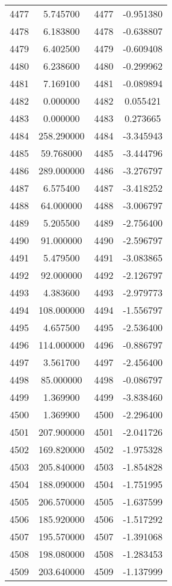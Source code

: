 \documentclass[12pt]{article}
\begin{document}
\begin{longtable}{@{}cccc@{}}
4477 & 5.745700 & 4477 & -0.951380 \\
4478 & 6.183800 & 4478 & -0.638807 \\
4479 & 6.402500 & 4479 & -0.609408 \\
4480 & 6.238600 & 4480 & -0.299962 \\
4481 & 7.169100 & 4481 & -0.089894 \\
4482 & 0.000000 & 4482 & 0.055421 \\
4483 & 0.000000 & 4483 & 0.273665 \\
4484 & 258.290000 & 4484 & -3.345943 \\
4485 & 59.768000 & 4485 & -3.444796 \\
4486 & 289.000000 & 4486 & -3.276797 \\
4487 & 6.575400 & 4487 & -3.418252 \\
4488 & 64.000000 & 4488 & -3.006797 \\
4489 & 5.205500 & 4489 & -2.756400 \\
4490 & 91.000000 & 4490 & -2.596797 \\
4491 & 5.479500 & 4491 & -3.083865 \\
4492 & 92.000000 & 4492 & -2.126797 \\
4493 & 4.383600 & 4493 & -2.979773 \\
4494 & 108.000000 & 4494 & -1.556797 \\
4495 & 4.657500 & 4495 & -2.536400 \\
4496 & 114.000000 & 4496 & -0.886797 \\
4497 & 3.561700 & 4497 & -2.456400 \\
4498 & 85.000000 & 4498 & -0.086797 \\
4499 & 1.369900 & 4499 & -3.838460 \\
4500 & 1.369900 & 4500 & -2.296400 \\
4501 & 207.900000 & 4501 & -2.041726 \\
4502 & 169.820000 & 4502 & -1.975328 \\
4503 & 205.840000 & 4503 & -1.854828 \\
4504 & 188.090000 & 4504 & -1.751995 \\
4505 & 206.570000 & 4505 & -1.637599 \\
4506 & 185.920000 & 4506 & -1.517292 \\
4507 & 195.570000 & 4507 & -1.391068 \\
4508 & 198.080000 & 4508 & -1.283453 \\
4509 & 203.640000 & 4509 & -1.137999 \\

\end{longtable}
\end{document}
